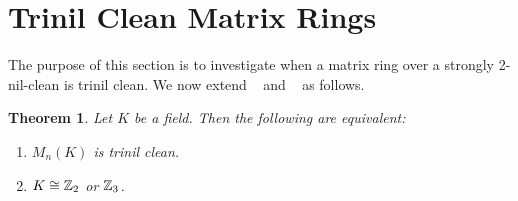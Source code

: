 \documentclass[12pt, reqno]{amsart}
\newtheorem{thm}{Theorem}[section]
\numberwithin{equation}{section}
\begin{document}
\section{Trinil Clean Matrix Rings}

The purpose of this section is to investigate when a matrix ring over a strongly 2-nil-clean is trinil clean. We now extend ~\cite[Theorem 3]{B} and ~\cite[Theorem 20]{BD} as follows.

\begin{thm} Let $K$ be a field. Then the following are equivalent:
\end{thm}
\begin{enumerate}
\item [(1)]{\it $M_n(K)$ is trinil clean.}
\vspace{-.5mm}
\item [(2)]{\it $K\cong {\Bbb Z}_2$ or ${\Bbb Z}_3$.}
\end{enumerate}
\end{document}
